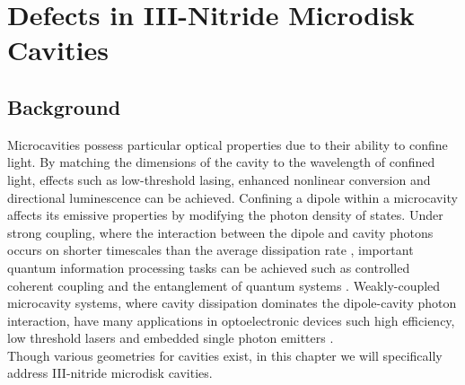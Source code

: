 
\chapter{Defects in III-Nitride Microdisk Cavities}

\ifpdf
    \graphicspath{{Chapter2/Figs/Raster/}{Chapter2/Figs/PDF/}{Chapter2/Figs/}}
\else
    \graphicspath{{Chapter2/Figs/Vector/}{Chapter2/Figs/}}
\fi


\section[Short title]{Background}

Microcavities possess particular optical properties due to their ability to confine light. By matching the dimensions of the cavity to the wavelength of confined light, effects such as low-threshold lasing, enhanced nonlinear conversion and directional luminescence can be achieved. Confining a dipole within a microcavity affects its emissive properties by modifying the photon density of states. Under strong coupling, where the interaction between the dipole and cavity photons occurs on shorter timescales than the average dissipation rate \cite{Reithmaier2004}, important quantum information processing tasks can be achieved such as controlled coherent coupling and the entanglement of quantum systems \cite{Hennessy2007}. Weakly-coupled microcavity systems, where cavity dissipation dominates the dipole-cavity photon interaction, have many applications in optoelectronic devices such high efficiency, low threshold lasers \cite{Vahala2003} and embedded single photon emitters \cite{Jarjour2007}.
\\ Though various geometries for cavities exist, in this chapter we will specifically address III-nitride microdisk cavities.